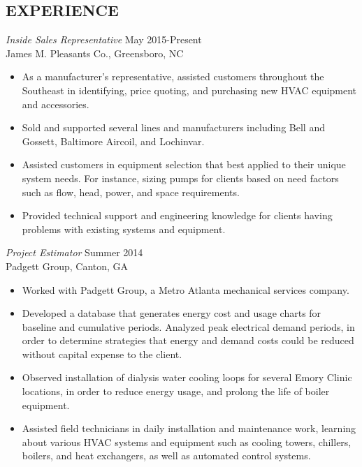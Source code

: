 \documentclass[margin]{res}
\begin{document}
\begin{resume}
 \section{EXPERIENCE} 
 {\sl Inside Sales Representative} \hfill May 2015-Present \\
 	James M. Pleasants Co., Greensboro, NC
   \begin{itemize}  \itemsep -2pt %
                 \item As a manufacturer's representative, assisted customers throughout the Southeast in identifying, price quoting, and purchasing new HVAC equipment and accessories.
                 \item Sold and supported several lines and manufacturers including Bell and Gossett, Baltimore Aircoil, and Lochinvar.
                \item Assisted customers in equipment selection that best applied to their unique system needs. For instance, sizing pumps for clients based on need factors such as flow, head, power, and space requirements.
                \item Provided technical support and engineering knowledge for clients having problems with existing systems and equipment.
                \end{itemize}
 
 {\sl Project Estimator} \hfill Summer 2014 \\
                Padgett Group, 
               Canton, GA
                 \begin{itemize}  \itemsep -2pt %
                 \item Worked with Padgett Group, a Metro Atlanta mechanical services company.
                 \item Developed a database that generates energy cost and usage charts for baseline and cumulative periods. Analyzed peak electrical demand periods, in order to determine strategies that energy and demand costs could be reduced without capital expense to the client.
                \item   Observed installation of dialysis water cooling loops for several Emory Clinic locations, in order to reduce energy usage, and prolong the life of boiler equipment.
                \item Assisted field technicians in daily installation and maintenance work, learning about various HVAC systems and equipment such as cooling towers, chillers, boilers, and heat 		      exchangers, as well as automated control systems.
                \end{itemize}
 

\end{resume}
\end{document}

